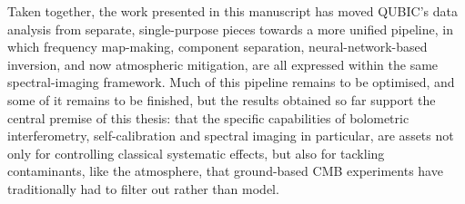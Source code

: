 \documentclass[../../thesis.tex]{subfiles}
\begin{document}
Taken together, the work presented in this manuscript has moved QUBIC's data analysis from separate, single-purpose pieces towards a more unified pipeline, in which frequency map-making, component separation, neural-network-based inversion, and now atmospheric mitigation, are all expressed within the same spectral-imaging framework. Much of this pipeline remains to be optimised, and some of it remains to be finished, but the results obtained so far support the central premise of this thesis: that the specific capabilities of bolometric interferometry, self-calibration and spectral imaging in particular, are assets not only for controlling classical systematic effects, but also for tackling contaminants, like the atmosphere, that ground-based CMB experiments have traditionally had to filter out rather than model.
\end{document}
